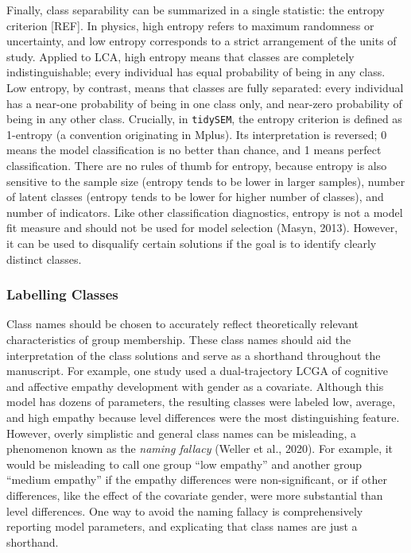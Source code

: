 \documentclass[
  ,man,floatsintext]{apa6}
\begin{document}
Finally, class separability can be summarized in a single statistic: the
entropy criterion {[}REF{]}.
In
physics, high entropy refers to maximum randomness or uncertainty, and
low entropy corresponds to a strict arrangement of the units of study.
Applied to LCA, high entropy means that classes are completely
indistinguishable; every individual has equal probability of being in
any class. Low entropy, by contrast, means that classes are fully
separated: every individual has a near-one probability of being in one
class only, and near-zero probability of being in any other class.
Crucially, in \texttt{tidySEM}, the entropy criterion is defined as 1-entropy
(a convention originating in Mplus). Its interpretation is reversed; 0
means the model classification is no better than chance, and 1 means
perfect classification. There are no rules of thumb for entropy, because
entropy is also sensitive to the sample size (entropy tends to be lower
in larger samples), number of latent classes (entropy tends to be lower
for higher number of classes), and number of indicators. Like other
classification diagnostics, entropy is not a model fit measure and
should not be used for model selection (Masyn, 2013). However, it
can be used to disqualify certain solutions if the goal is to identify
clearly distinct classes.

\hypertarget{labelling-classes}{%
\subsubsection{Labelling Classes}\label{labelling-classes}}

Class names should be chosen to accurately reflect theoretically
relevant characteristics of group membership. These class names should
aid the interpretation of the class solutions and serve as a shorthand
throughout the manuscript. For example, one study used a dual-trajectory
LCGA of cognitive and affective empathy development with gender as a
covariate. Although this model has dozens of parameters, the resulting
classes were labeled low, average, and high empathy because level
differences were the most distinguishing feature. However, overly
simplistic and general class names can be misleading, a phenomenon known
as the \emph{naming fallacy} (Weller et al., 2020). For example, it would be
misleading to call one group ``low empathy'' and another group ``medium
empathy'' if the empathy differences were non-significant, or if other
differences, like the effect of the covariate gender, were more
substantial than level differences. One way to avoid the naming fallacy
is comprehensively reporting model parameters, and explicating that
class names are just a shorthand.
\end{document}
